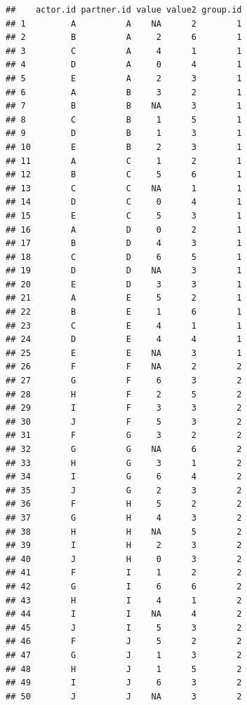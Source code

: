 \documentclass[a4paper]{article}\usepackage[]{graphicx}\usepackage[]{color}
\makeatletter
\newenvironment{kframe}{%
 \def\at@end@of@kframe{}%
 \ifinner\ifhmode%
  \def\at@end@of@kframe{\end{minipage}}%
  \begin{minipage}{\columnwidth}%
 \fi\fi%
 \def\FrameCommand##1{\hskip\@totalleftmargin \hskip-\fboxsep
 \colorbox{shadecolor}{##1}\hskip-\fboxsep
     \hskip-\linewidth \hskip-\@totalleftmargin \hskip\columnwidth}%
 \MakeFramed {\advance\hsize-\width
   \@totalleftmargin\z@ \linewidth\hsize
   \@setminipage}}%
 {\par\unskip\endMakeFramed%
 \at@end@of@kframe}
\newenvironment{knitrout}{}{} %
\makeatother
\begin{document}
\begin{knitrout}\small
{}\color{fgcolor}\begin{kframe}
\begin{verbatim}
##    actor.id partner.id value value2 group.id
## 1         A          A    NA      2        1
## 2         B          A     2      6        1
## 3         C          A     4      1        1
## 4         D          A     0      4        1
## 5         E          A     2      3        1
## 6         A          B     3      2        1
## 7         B          B    NA      3        1
## 8         C          B     1      5        1
## 9         D          B     1      3        1
## 10        E          B     2      3        1
## 11        A          C     1      2        1
## 12        B          C     5      6        1
## 13        C          C    NA      1        1
## 14        D          C     0      4        1
## 15        E          C     5      3        1
## 16        A          D     0      2        1
## 17        B          D     4      3        1
## 18        C          D     6      5        1
## 19        D          D    NA      3        1
## 20        E          D     3      3        1
## 21        A          E     5      2        1
## 22        B          E     1      6        1
## 23        C          E     4      1        1
## 24        D          E     4      4        1
## 25        E          E    NA      3        1
## 26        F          F    NA      2        2
## 27        G          F     6      3        2
## 28        H          F     2      5        2
## 29        I          F     3      3        2
## 30        J          F     5      3        2
## 31        F          G     3      2        2
## 32        G          G    NA      6        2
## 33        H          G     3      1        2
## 34        I          G     6      4        2
## 35        J          G     2      3        2
## 36        F          H     5      2        2
## 37        G          H     4      3        2
## 38        H          H    NA      5        2
## 39        I          H     2      3        2
## 40        J          H     0      3        2
## 41        F          I     1      2        2
## 42        G          I     6      6        2
## 43        H          I     4      1        2
## 44        I          I    NA      4        2
## 45        J          I     5      3        2
## 46        F          J     5      2        2
## 47        G          J     1      3        2
## 48        H          J     1      5        2
## 49        I          J     6      3        2
## 50        J          J    NA      3        2
\end{verbatim}
\end{kframe}
\end{knitrout}
\end{document}
